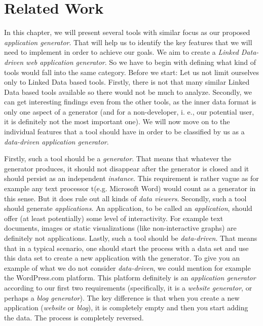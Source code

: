\chapter{Related Work}

In this chapter, we will present several tools with similar focus as our proposed \emph{application generator}. That will help us to identify the key features that we will need to implement in order to achieve our goals. We aim to create a \emph{Linked Data-driven web application generator}. So we have to begin with defining what kind of tools would fall into the same category. Before we start: Let us not limit ourselves only to Linked Data based tools. Firstly, there is not that many similar Linked Data based tools available so there would not be much to analyze. Secondly, we can get interesting findings even from the other tools, as the inner data format is only one aspect of a generator (and for a non-developer, i. e., our potential user, it is definitely not the most important one). We will now move on to the individual features that a tool should have in order to be classified by us as a \emph{data-driven application generator}.

Firstly, such a tool should be a \emph{generator}. That means that whatever the generator produces, it should not disappear after the generator is closed and it should persist as an independent \emph{instance}. This requirement is rather vague as for example any text processor t(e.g. Microsoft Word) would count as a generator in this sense. But it does rule out all kinds of \emph{data viewers}. Secondly, such a tool should generate \emph{applications}. An application, to be called an \emph{application}, should offer (at least potentially) some level of interactivity. For example text documents, images or static visualizations (like non-interactive graphs) are definitely not applications. Lastly, such a tool should be \emph{data-driven}. That means that in a typical scenario, one should start the process with a data set and use this data set to create a new application with the generator.  To give you an example of what we do not consider \emph{data-driven}, we could mention for example the WordPress.com \cite{wordpress} platform. This platform definitely is an \emph{application generator} according to our first two requirements (specifically, it is a \emph{website generator}, or perhaps a \emph{blog generator}). The key difference is that when you create a new application (\emph{website} or \emph{blog}), it is completely empty and then you start adding the data. The process is completely reversed.


